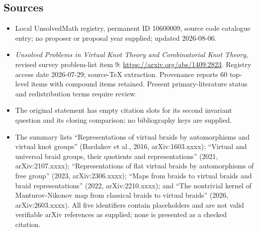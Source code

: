 \documentclass[11pt]{article}
\begin{document}
\subsection{Sources}
\begin{itemize}
\item Local UnsolvedMath registry, permanent ID 10600009, source code catalogue entry; no proposer or proposal year supplied; updated 2026-08-06.
\item \emph{Unsolved Problems in Virtual Knot Theory and Combinatorial Knot Theory}, revised survey problem-list item 9: \url{https://arxiv.org/abs/1409.2823}. Registry access date 2026-07-29; source-TeX extraction. Provenance reports 60 top-level items with compound items retained. Present primary-literature status and redistribution terms require review.
\item The original statement has empty citation slots for its second invariant question and its closing comparison; no bibliography keys are supplied.
\item The summary lists ``Representations of virtual braids by automorphisms and virtual knot groups'' (Bardakov et al., 2016, arXiv:1603.xxxx); ``Virtual and universal braid groups, their quotients and representations'' (2021, arXiv:2107.xxxx); ``Representations of flat virtual braids by automorphisms of free group'' (2023, arXiv:2306.xxxx); ``Maps from braids to virtual braids and braid representations'' (2022, arXiv:2210.xxxx); and ``The nontrivial kernel of Manturov-Nikonov map from classical braids to virtual braids'' (2026, arXiv:2603.xxxx). All five identifiers contain placeholders and are not valid verifiable arXiv references as supplied; none is presented as a checked citation.
\end{itemize}
\end{document}
